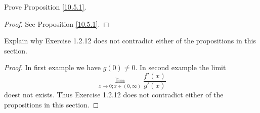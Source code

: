 \exercisesection

\begin{exercise}\label{ex 10.5.1}
    Prove Proposition \ref{10.5.1}.
\end{exercise}

\begin{proof}
    See Proposition \ref{10.5.1}.
\end{proof}

\begin{exercise}\label{ex 10.5.2}
    Explain why Exercise 1.2.12 does not contradict either of the propositions in this section.
\end{exercise}

\begin{proof}
    In first example we have \(g(0) \neq 0\).
    In second example the limit
    \[
        \lim_{x \to 0 ; x \in (0, \infty)} \frac{f'(x)}{g'(x)}
    \]
    doest not exists.
    Thus Exercise 1.2.12 does not contradict either of the propositions in this section.
\end{proof}
